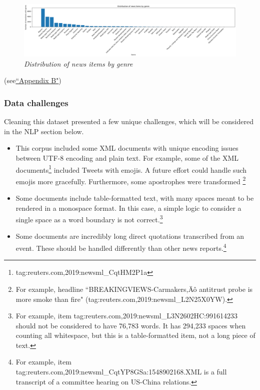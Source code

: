 \documentclass[11pt]{article}
\begin{document}
\begin{itemize}
{    \begin{figure}
      \centerline{\includegraphics[scale=0.3]{distribution_news_item_genre}}
      \caption{\textit{Distribution of news items by genre}}
    \end{figure}

    }
  \end{itemize}
  (see\hyperref[sec:AppendixB]{``Appendix B"})
  
  \subsubsection{Data challenges}
  Cleaning this dataset presented a few unique challenges, which will be considered in the NLP section below.
  \begin{itemize}
    \item{This corpus included some XML documents with unique encoding issues between UTF-8 encoding and plain text. For example, some of the XML documents\footnote{tag:reuters.com,2019:newsml\_CqtHM2P1a} included Tweets with emojis. A future effort could handle such emojis more gracefully. Furthermore, some apostrophes were transformed \footnote{For example, headline ``BREAKINGVIEWS-Carmakers,\"A\^o antitrust probe is more smoke than fire" (tag:reuters.com,2019:newsml\_L2N25X0YW).}
    }
    \item{Some documents include table-formatted text, with many spaces meant to be rendered in a monospace format. In this case, a simple logic to consider a single space as a word boundary is not correct.\footnote{For example, item tag:reuters.com,2019:newsml\_L3N2602HC:991614233 should not be considered to have 76,783 words. It has 294,233 spaces when counting all whitespace, but this is a table-formatted item, not a long piece of text.}}
    \item{Some documents are incredibly long direct quotations transcribed from an event. These should be handled differently than other news reports.\footnote{For example, item tag:reuters.com,2019:newsml\_CqtYP8GSa:1548902168.XML is a full transcript of a committee hearing on US-China relations.}}
  \end{itemize}
\end{document}
